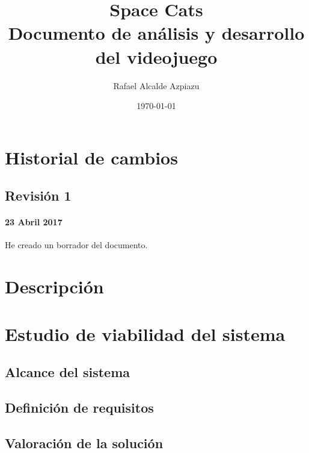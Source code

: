 \documentclass[12pt, spanish, a4paper]{article}
\title{Space Cats \\ Documento de análisis y desarrollo del videojuego}
\date{\today}
\author{Rafael Alcalde Azpiazu}
\begin{document}
	
	\maketitle
	\newpage
	
	\tableofcontents
	\newpage
	
	
	
	\section{Historial de cambios}
	
	\subsection{Revisión 1}
	
	\paragraph{23 Abril 2017} He creado un borrador del documento.
	
	\newpage
	
	\section{Descripción}
	
	\lipsum[28]
	
	\section{Estudio de viabilidad del sistema}
	
	\subsection{Alcance del sistema}
	
	\lipsum[30]
	
	\subsection{Definición de requisitos}
	
	\lipsum[31]
	
	\subsection{Valoración de la solución}
	
	\lipsum[31]
	
\end{document}
